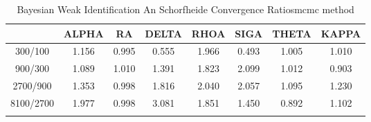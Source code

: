 \documentclass[a4paper,10pt]{article}
\begin{document}
\centering
\begin{longtable}{cccccccc}
\toprule
 & ALPHA & RA & DELTA & RHOA & SIGA & THETA & KAPPA \\
\midrule
300/100 & 1.156 & 0.995 & 0.555 & 1.966 & 0.493 & 1.005 & 1.010 \\
900/300 & 1.089 & 1.010 & 1.391 & 1.823 & 2.099 & 1.012 & 0.903 \\
2700/900 & 1.353 & 0.998 & 1.816 & 2.040 & 2.057 & 1.095 & 1.230 \\
8100/2700 & 1.977 & 0.998 & 3.081 & 1.851 & 1.450 & 0.892 & 1.102 \\
\bottomrule
\caption{Bayesian Weak Identification An Schorfheide Convergence Ratiosmcmc method}
\label{table:tbl:WeakAnSchoConvergenceRatios_mcmc}
\end{longtable}
\end{document}
